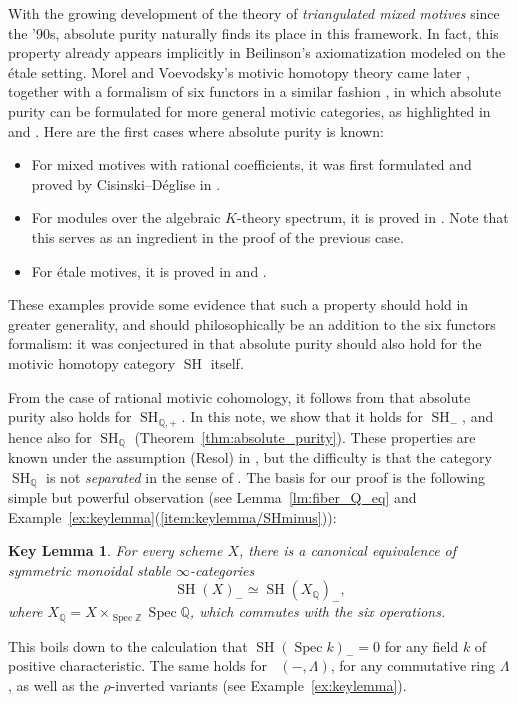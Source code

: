 \documentclass[11pt]{article}
\numberwithin{equation}{section}\renewcommand{\encodingdefault}{TU}
\renewcommand{\AA}{\mathbb A}
\DeclareMathOperator{\SH}{SH}
\DeclareMathOperator{\DAminus}{D_{\AA^1,-}}
\DeclareMathOperator{\spec}{Spec}
\newcommand{\ZZ} {\mathbb Z}
\newcommand{\QQ} {\mathbb Q}
\newtheorem*{lmi}{Key Lemma}
\theoremstyle{remark}
\theoremstyle{definition}
\numberwithin{equation}{thm}
\begin{document}
With the growing development of the theory of \emph{triangulated mixed motives} since the '90s, absolute purity naturally finds its place in this framework.
In fact, this property already appears implicitly in Beilinson's axiomatization modeled on the étale setting. Morel and Voevodsky's motivic homotopy theory came later \cite{MV}, together with a formalism of six functors in a similar fashion \cite{AyoubThesis}, in which absolute purity can be formulated for more general motivic categories, as highlighted in \cite[A.2]{CDEtale} and \cite[4.3]{DJK}.
Here are the first cases where absolute purity is known:
\begin{itemize}
\item For mixed motives with rational coefficients, it was first formulated and proved by Cisinski--Déglise in \cite[Th.\,14.4.1]{CD3}.
\item For modules over the algebraic $K$-theory spectrum, it is proved in \cite[Th.\,13.6.3]{CD3}. Note that this serves as an ingredient in the proof of the previous case.
\item For étale motives, it is proved in \cite{AyoubEt} and \cite{CD5}.
\end{itemize}
These examples provide some evidence that such a property should hold in greater generality, and should philosophically be an addition to the six functors formalism: it was conjectured in \cite{DegliseOrientation} that absolute purity should also hold for the motivic homotopy category $\SH$ itself.

From the case of rational motivic cohomology, it follows from \cite[Th.\,16.2.13]{CD3} that absolute purity also holds for $\SH_{\QQ,+}$.
In this note, we show that it holds for $\SH_{-}$, and hence also for $\SH_{\QQ}$ (Theorem~\ref{thm:absolute_purity}).
These properties are known under the assumption (Resol) in \cite[2.4.1]{BD1}, but the difficulty is that the category $\SH_\QQ$ is not \emph{separated} in the sense of \cite[Def.\,2.1.7]{CD3}.
The basis for our proof is the following simple but powerful observation (see Lemma~\ref{lm:fiber_Q_eq} and Example~\ref{ex:keylemma}(\ref{item:keylemma/SHminus})):

\begin{lmi}
For every scheme $X$, there is a canonical equivalence of symmetric monoidal stable $\infty$-categories
\[
\SH(X)_- \simeq \SH(X_\QQ)_-,
\]
where $X_\QQ = X \times_{\spec{\ZZ}} \spec{\QQ}$, which commutes with the six operations.
\end{lmi}

This boils down to the calculation that $\SH(\spec{k})_- = 0$ for any field $k$ of positive characteristic.
The same holds for $\DAminus(-, \Lambda)$, for any commutative ring $\Lambda$, as well as the $\rho$-inverted variants (see Example~\ref{ex:keylemma}).
\end{document}
